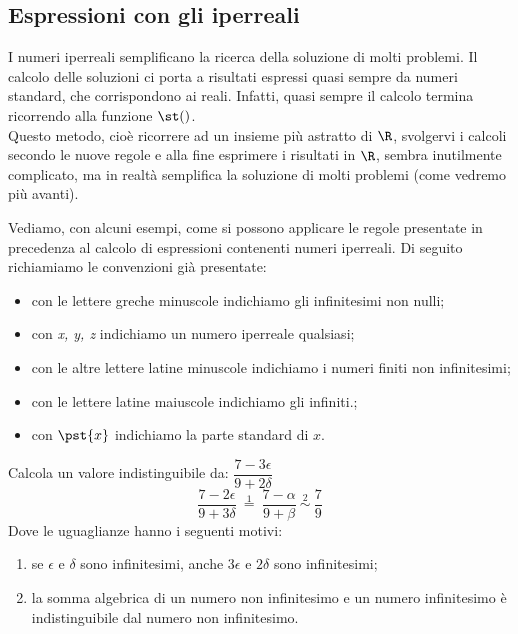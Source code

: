 \subsection{Espressioni con gli iperreali}
\label{subsec:insnum_espressioni}

I numeri iperreali semplificano la ricerca della soluzione di molti 
problemi.
Il calcolo delle soluzioni ci porta a risultati espressi quasi sempre da 
numeri standard, che corrispondono ai reali. Infatti, quasi sempre il 
calcolo termina ricorrendo alla funzione \(\st()\).\\
Questo metodo, cioè ricorrere ad un insieme più astratto di \(\R\), 
svolgervi i calcoli secondo le nuove regole e alla fine esprimere i 
risultati in \(\R\), 
sembra inutilmente complicato, 
ma in realtà semplifica la soluzione di molti problemi 
(come vedremo più avanti).

Vediamo, con alcuni esempi, come si possono applicare 
le regole presentate in precedenza al calcolo di espressioni 
contenenti numeri iperreali. 
Di seguito richiamiamo le convenzioni già presentate:
\begin{itemize} [nosep]
 \item con le lettere greche minuscole indichiamo gli infinitesimi non 
nulli;
 \item con \emph{x, y, z} indichiamo un numero iperreale qualsiasi;
 \item con le altre lettere latine minuscole indichiamo i numeri finiti non 
infinitesimi;
 \item con le lettere latine maiuscole indichiamo gli infiniti.;
 \item con \(\pst{x}\) indichiamo la parte standard di \(x\).
\end{itemize}

\begin{esempio}
Calcola un valore indistinguibile da:
\(\dfrac{7 -3 \epsilon}{9 +2 \delta}\)
\[\dfrac{7 -2 \epsilon}{9 +3 \delta} 
~ \stackrel{1}{=} ~
  \dfrac{7 -\alpha}{9 +\beta}
~ \stackrel{2}{\sim} ~ \dfrac{7}{9}\]
Dove le uguaglianze hanno i seguenti motivi:
\begin{enumerate} [nosep] 
 \item se \(\epsilon \text{ e } \delta\) sono infinitesimi, 
 anche \(3\epsilon\) e \(2 \delta\) sono infinitesimi;
 \item la somma algebrica di un numero non infinitesimo e un numero 
infinitesimo è indistinguibile dal numero non infinitesimo.
\end{enumerate}
\end{esempio}

